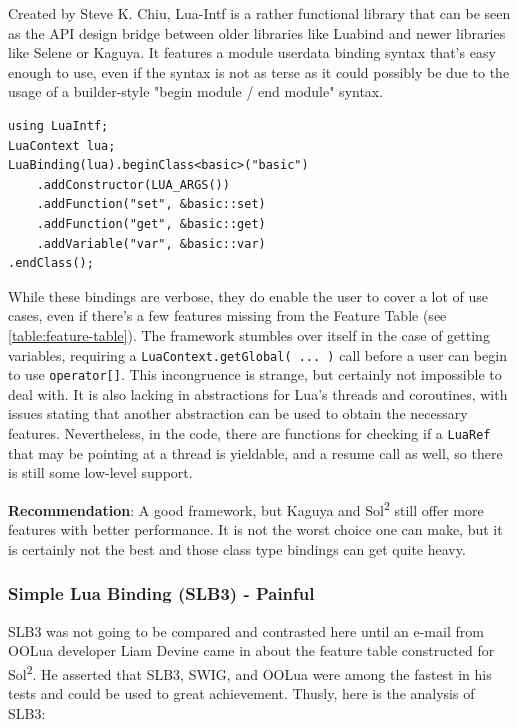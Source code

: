 \documentclass[conference,compsoc]{IEEEtran}
\newcommand{\soltwo}{Sol\textsuperscript{2}}
\begin{document}
Created by Steve K. Chiu, Lua-Intf\cite{lua-intf} is a rather functional library that can be seen as the API design bridge between older libraries like Luabind and newer libraries like Selene or Kaguya. It features a module userdata binding syntax that's easy enough to use, even if the syntax is not as terse as it could possibly be due to the usage of a builder-style "begin module / end module" syntax.

\begin{lstlisting}[caption={Binding the basic example from \cref{lst:basic-code}} in Lua-Intf,
label={lst:lua-intf-binding}]
using LuaIntf;
LuaContext lua;
LuaBinding(lua).beginClass<basic>("basic")
	.addConstructor(LUA_ARGS())
	.addFunction("set", &basic::set)
	.addFunction("get", &basic::get)
	.addVariable("var", &basic::var)
.endClass();
\end{lstlisting}

While these bindings are verbose, they do enable the user to cover a lot of use cases, even if there's a few features missing from the Feature Table (see \cref{table:feature-table}). The framework stumbles over itself in the case of getting variables, requiring a \lstinline|LuaContext.getGlobal( ... )| call before a user can begin to use \lstinline|operator[]|. This incongruence is strange, but certainly not impossible to deal with. It is also lacking in abstractions for Lua's threads and coroutines, with issues stating that another abstraction can be used to obtain the necessary features. Nevertheless, in the code, there are functions for checking if a \lstinline|LuaRef| that may be pointing at a thread is yieldable, and a resume call as well, so there is still some low-level support.

\textbf{Recommendation}: A good framework, but Kaguya and \soltwo{} still offer more features with better performance. It is not the worst choice one can make, but it is certainly not the best and those class type bindings can get quite heavy.

\subsubsection{Simple Lua Binding (SLB3) - Painful}

SLB3 was not going to be compared and contrasted here until an e-mail from OOLua developer Liam Devine came in about the feature table constructed for \soltwo{}. He asserted that SLB3, SWIG, and OOLua were among the fastest in his tests and could be used to great achievement. Thusly, here is the analysis of SLB3:
\end{document}
